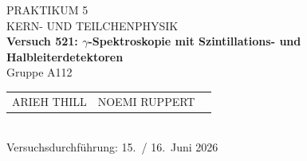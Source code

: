 \documentclass[%
paper=a4,       %
fontsize=11pt,  %
ngerman         %
]{scrreprt}
\begin{document}
\begin{titlepage}
  \centering
  \vspace*{2cm}
  
  {\Large PRAKTIKUM 5}\\[0.5cm]
  {\large KERN- UND TEILCHENPHYSIK }\\[1cm]
  
  {\LARGE\bfseries Versuch 521: $\gamma$-Spektroskopie mit Szintillations- und Halbleiterdetektoren}\\[1cm]
  
  Gruppe A112\\[1cm]
  
  \begin{tabular}{lll}
    ARIEH THILL & NOEMI RUPPERT  \\
  \end{tabular}\\[2cm]
  
  Versuchsdurchführung: 15.~/ 16.~Juni 2026
  
  \vfill
\end{titlepage}

\tableofcontents
\clearpage
\clearpage
\setcounter{page}{1}
 
 
 



\appendix
\printbibliography{}
%
\end{document}
